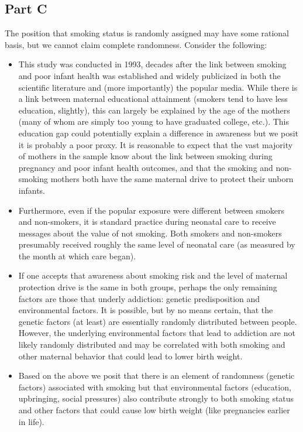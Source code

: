 \documentclass[a4paper, 12pt]{article}
\begin{document}
\subsection{Part C}
The position that smoking status is randomly assigned may have some rational basis, but we cannot claim complete randomness.  Consider the following:

\begin{itemize}
\item This study was conducted in 1993, decades after the link between smoking and poor infant health was established and widely publicized in both the scientific literature and (more importantly) the popular media.  While there is a link between maternal educational attainment (smokers tend to have less education, slightly), this can largely be explained by the age of the mothers (many of whom are simply too young to have graduated college, etc.).  This education gap could potentially explain a difference in awareness but we posit it is probably a poor proxy.  It is reasonable to expect that the vast majority of mothers in the sample know about the link between smoking during pregnancy and poor infant health outcomes, and that the smoking and non-smoking mothers both have the same maternal drive to protect their unborn infants.

\item Furthermore, even if the popular exposure were different between smokers and non-smokers, it is standard practice during neonatal care to receive messages about the value of not smoking.  Both smokers and non-smokers presumably received roughly the same level of neonatal care (as measured by the month at which care began).  

\item If one accepts that awareness about smoking risk and the level of maternal protection drive is the same in both groups, perhaps the only remaining factors are those that underly addiction: genetic predisposition and environmental factors.  It is possible, but by no means certain, that the genetic factors (at least) are essentially randomly distributed between people.  However, the underlying environmental factors that lead to addiction are not likely randomly distributed and may be correlated with both smoking and other maternal behavior that could lead to lower birth weight.  

\item Based on the above we posit that there is an element of randomness (genetic factors) associated with smoking but that environmental factors (education, upbringing, social pressures) also contribute strongly to both smoking status and other factors that could cause low birth weight (like pregnancies earlier in life).  

\end{itemize}
\end{document}
